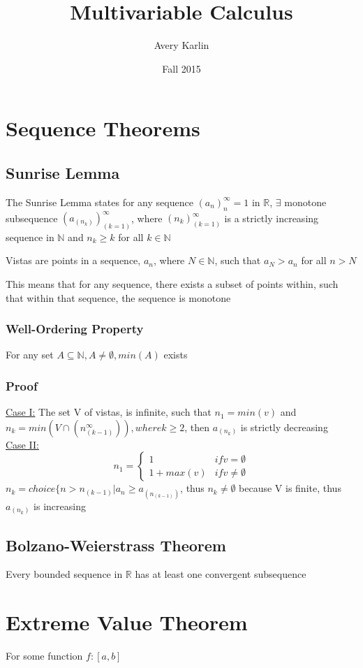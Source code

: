 \documentclass[11 pt, twoside]{article}
\begin{document}
\title{Multivariable Calculus}
\author{Avery Karlin}
\date{Fall 2015}

\maketitle
\newpage
\tableofcontents
\newpage



\section{Sequence Theorems}
\subsection{Sunrise Lemma}
The Sunrise Lemma states for any sequence $(a_n)^\infty_n=1$ in $\mathbb{R}$, $\exists$ monotone subsequence $(a_(n_k))^\infty_(k=1)$, where $(n_k)^\infty_(k=1)$ is a strictly increasing sequence in $\mathbb{N}$ and $n_k \geq k$ for all $k \in \mathbb{N}$

Vistas are points in a sequence, $a_n$, where  $N \in \mathbb{N}$, such that $a_N > a_n$ for all $n > N$

This means that for any sequence, there exists a subset of points within, such that within that sequence, the sequence is monotone

\subsubsection{Well-Ordering Property}
For any set $A \subseteq \mathbb{N}, A \neq \emptyset, min(A)$ exists

\subsubsection{Proof}
\underline{Case I:} The set V of vistas, is infinite, such that $n_1 = min(v)$ and $n_k = min(V \cap (n_(k-1)^\infty)), where k \geq 2$, then $a_(n_k)$ is strictly decreasing\\
\underline{Case II:}
\[ n_1 =
\begin{cases}
1 & if v = \emptyset \\
1 + max(v) & if v \neq \emptyset
\end{cases} \]
$n_k = choice\{n > n_(k-1) | a_n \geq a_(n_(k-1))$, thus $n_k \neq \emptyset$ because V is finite, thus $a_(n_k)$ is increasing

\subsection{Bolzano-Weierstrass Theorem}
Every bounded sequence in $\mathbb{R}$ has at least one convergent subsequence

\section{Extreme Value Theorem}
For some function $f:[a, b]$ 
\end{document}
